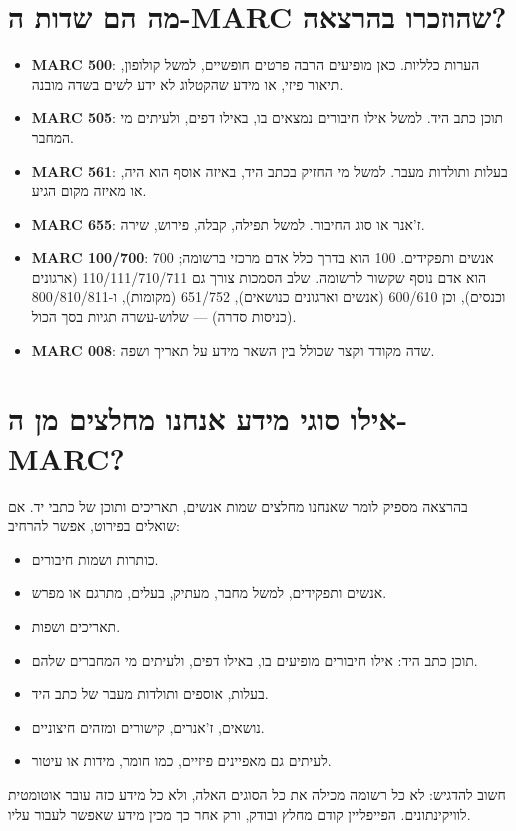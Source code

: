 \documentclass[12pt,a4paper]{article}
\begin{document}
\section{\texthebrew{מה הם שדות ה-MARC שהוזכרו בהרצאה?}}
\begin{hebrew}
\begin{itemize}
  \item \textbf{MARC 500}: הערות כלליות. כאן מופיעים הרבה פרטים חופשיים, למשל קולופון, תיאור פיזי, או מידע שהקטלוג לא ידע לשים בשדה מובנה.
  \item \textbf{MARC 505}: תוכן כתב היד. למשל אילו חיבורים נמצאים בו, באילו דפים, ולעיתים מי המחבר.
  \item \textbf{MARC 561}: בעלות ותולדות מעבר. למשל מי החזיק בכתב היד, באיזה אוסף הוא היה, או מאיזה מקום הגיע.
  \item \textbf{MARC 655}: ז'אנר או סוג החיבור. למשל תפילה, קבלה, פירוש, שירה.
  \item \textbf{MARC 100/700}: אנשים ותפקידים. 100 הוא בדרך כלל אדם מרכזי ברשומה; 700 הוא אדם נוסף שקשור לרשומה. שלב הסמכות צורך גם 110/111/710/711 (ארגונים וכנסים), וכן 600/610 (אנשים וארגונים כנושאים), 651/752 (מקומות), ו-800/810/811 (כניסות סדרה) --- שלוש-עשרה תגיות בסך הכול.
  \item \textbf{MARC 008}: שדה מקודד וקצר שכולל בין השאר מידע על תאריך ושפה.
\end{itemize}
\end{hebrew}

\section{\texthebrew{אילו סוגי מידע אנחנו מחלצים מן ה-MARC?}}
\begin{hebrew}
בהרצאה מספיק לומר שאנחנו מחלצים שמות אנשים, תאריכים ותוכן של כתבי יד. אם שואלים בפירוט, אפשר להרחיב:
\begin{itemize}
  \item כותרות ושמות חיבורים.
  \item אנשים ותפקידים, למשל מחבר, מעתיק, בעלים, מתרגם או מפרש.
  \item תאריכים ושפות.
  \item תוכן כתב היד: אילו חיבורים מופיעים בו, באילו דפים, ולעיתים מי המחברים שלהם.
  \item בעלות, אוספים ותולדות מעבר של כתב היד.
  \item נושאים, ז'אנרים, קישורים ומזהים חיצוניים.
  \item לעיתים גם מאפיינים פיזיים, כמו חומר, מידות או עיטור.
\end{itemize}
\par
חשוב להדגיש: לא כל רשומה מכילה את כל הסוגים האלה, ולא כל מידע כזה עובר אוטומטית לוויקינתונים. הפייפליין קודם מחלץ ובודק, ורק אחר כך מכין מידע שאפשר לעבור עליו.
\end{hebrew}
\end{document}
